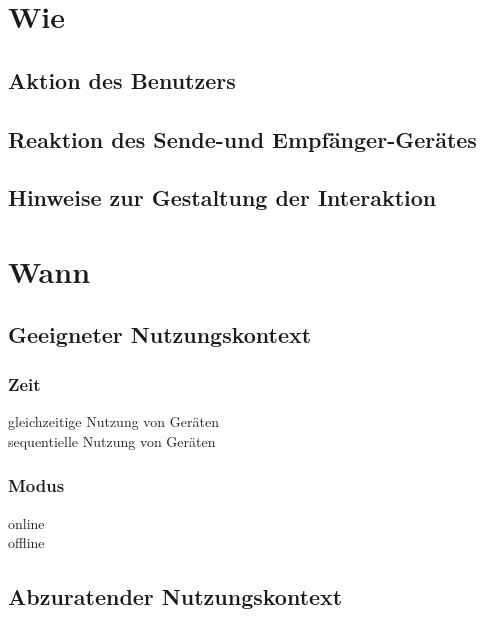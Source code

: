 \section*{Wie}

\subsection*{Aktion des Benutzers}
\useraction

\subsection*{Reaktion des Sende-und Empfänger-Gerätes}

\subsection*{Hinweise zur Gestaltung der Interaktion}



\section*{Wann}

\subsection*{Geeigneter Nutzungskontext}

\subsubsection*{Zeit}
 gleichzeitige Nutzung von Geräten \\
 sequentielle Nutzung von Geräten 

\subsubsection*{Modus}
 online \\
 offline \\


\subsection*{Abzuratender Nutzungskontext}

